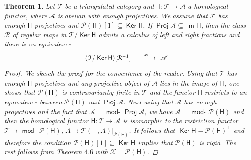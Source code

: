 \documentclass[oneside, a4paper,reqno]{amsart}
\numberwithin{equation}{section}
\newtheorem{thm}{Theorem}[section]
\theoremstyle{definition}
\begin{document}
 \begin{thm} Let ${\mathcal T}$ be a triangulated category and $\mathsf{H} \colon {\mathcal T} {\longrightarrow} {\mathscr A}$ a homological functor, where ${\mathscr A}$ is abelian with enough projectives. We assume that ${\mathcal T}$ has enough $\mathsf{H}$-projectives and $\mathcal P(\mathsf{H})[1] \subseteq \operatorname*{\mathsf{Ker}}\mathsf{H}$. If $\operatorname*{\mathsf{Proj}}{\mathscr A} \subseteq \operatorname*{\mathsf{Im}} \mathsf{H}$,  
 then the class $\mathcal R$ of regular maps in ${\mathcal T}/\operatorname*{\mathsf{Ker}}\mathsf{H}$ admits a calculus of left and right fractions and there is an equivalence
 \[
\begin{CD}
({\mathcal T}/\operatorname*{\mathsf{Ker}}\mathsf{H})[\mathcal R^{-1}] \, @> \approx >> \, {\mathscr A}
\end{CD}
\] 
\begin{proof} We sketch the proof for the convenience of the reader. Using that ${\mathcal T}$ has enough $\mathsf{H}$-projectives and any projective object of ${\mathscr A}$ lies in the image of $\mathsf{H}$, one shows that $\mathcal P(\mathsf{H})$ is contravariantly finite in ${\mathcal T}$ and the functor $\mathsf{H}$ restricts to an equivalence between $\mathcal P(\mathsf{H})$ and $\operatorname*{\mathsf{Proj}}{\mathscr A}$. Next using that ${\mathscr A}$ has enough projectives and the fact that ${\mathscr A} = \operatorname*{\mathsf{mod}-\!}\operatorname*{\mathsf{Proj}}{\mathscr A}$, we have ${\mathscr A} = \operatorname*{\mathsf{mod}-\!}\mathcal P(\mathsf{H})$ and then the homological functor $\mathsf{H} \colon {\mathcal T} {\longrightarrow} {\mathscr A}$ is isomorphic to the restriction functor ${\mathcal T} {\longrightarrow} \operatorname*{\mathsf{mod}-\!}\mathcal P(\mathsf{H})$, $A \longmapsto {\mathcal T}(-,A)|_{\mathcal P(\mathsf{H})}$. It follows that $\operatorname*{\mathsf{Ker}}\mathsf{H} = \mathcal P(\mathsf{H})^{\bot}$ and therefore the condition $\mathcal P(\mathsf{H})[1] \subseteq \operatorname*{\mathsf{Ker}}\mathsf{H}$ implies that $\mathcal P(\mathsf{H})$ is rigid.  The rest follows from Theorem  $4.6$ with ${\mathcal X} = \mathcal P(\mathsf{H})$. 
\end{proof}
\end{thm} 
\end{document}
